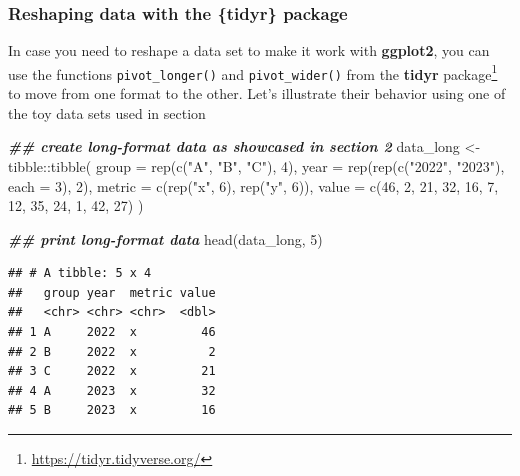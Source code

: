 \documentclass[
]{krantz}
\makeatletter
\newenvironment{Shaded}{\begin{snugshade}}{\end{snugshade}}
\newcommand{\AttributeTok}[1]{\textcolor[rgb]{0.61,0.61,0.61}{#1}}
\newcommand{\DecValTok}[1]{\textcolor[rgb]{0.06,0.06,0.06}{#1}}
\newcommand{\DocumentationTok}[1]{\textcolor[rgb]{0.37,0.37,0.37}{\textbf{\textit{#1}}}}
\newcommand{\FunctionTok}[1]{\textcolor[rgb]{0,0,0}{#1}}
\newcommand{\NormalTok}[1]{#1}
\newcommand{\OtherTok}[1]{\textcolor[rgb]{0.37,0.37,0.37}{#1}}
\newcommand{\SpecialCharTok}[1]{\textcolor[rgb]{0,0,0}{#1}}
\newcommand{\StringTok}[1]{\textcolor[rgb]{0.5,0.5,0.5}{#1}}
\renewcommand{\href}[2]{#2\footnote{\url{#1}}}
\newenvironment{kframe}{%
\medskip{}
\setlength{\fboxsep}{.8em}
 \def\at@end@of@kframe{}%
 \ifinner\ifhmode%
  \def\at@end@of@kframe{\end{minipage}}%
  \begin{minipage}{\columnwidth}%
 \fi\fi%
 \def\FrameCommand##1{\hskip\@totalleftmargin \hskip-\fboxsep
 \colorbox{shadecolor}{##1}\hskip-\fboxsep
     \hskip-\linewidth \hskip-\@totalleftmargin \hskip\columnwidth}%
 \MakeFramed {\advance\hsize-\width
   \@totalleftmargin\z@ \linewidth\hsize
   \@setminipage}}%
 {\par\unskip\endMakeFramed%
 \at@end@of@kframe}
\renewenvironment{Shaded}{\begin{kframe}}{\end{kframe}}
\makeatother
\begin{document}
\hypertarget{tidyr}{%
\subsubsection{Reshaping data with the \{tidyr\} package}\label{tidyr}}

In case you need to reshape a data set to make it work with \textbf{ggplot2}, you can use the functions \texttt{pivot\_longer()} and \texttt{pivot\_wider()} from the \href{https://tidyr.tidyverse.org/}{\textbf{tidyr} package} \citep{tidyr} to move from one format to the other. Let's illustrate their behavior using one of the toy data sets used in section

\begin{Shaded}
\begin{Highlighting}[]
\DocumentationTok{\#\# create long{-}format data as showcased in section 2}
\NormalTok{data\_long }\OtherTok{\textless{}{-}}\NormalTok{ tibble}\SpecialCharTok{::}\FunctionTok{tibble}\NormalTok{(}
  \AttributeTok{group =} \FunctionTok{rep}\NormalTok{(}\FunctionTok{c}\NormalTok{(}\StringTok{"A"}\NormalTok{, }\StringTok{"B"}\NormalTok{, }\StringTok{"C"}\NormalTok{), }\DecValTok{4}\NormalTok{),}
  \AttributeTok{year =} \FunctionTok{rep}\NormalTok{(}\FunctionTok{rep}\NormalTok{(}\FunctionTok{c}\NormalTok{(}\StringTok{"2022"}\NormalTok{, }\StringTok{"2023"}\NormalTok{), }\AttributeTok{each =} \DecValTok{3}\NormalTok{), }\DecValTok{2}\NormalTok{),}
  \AttributeTok{metric =} \FunctionTok{c}\NormalTok{(}\FunctionTok{rep}\NormalTok{(}\StringTok{"x"}\NormalTok{, }\DecValTok{6}\NormalTok{), }\FunctionTok{rep}\NormalTok{(}\StringTok{"y"}\NormalTok{, }\DecValTok{6}\NormalTok{)),}
  \AttributeTok{value =} \FunctionTok{c}\NormalTok{(}\DecValTok{46}\NormalTok{, }\DecValTok{2}\NormalTok{, }\DecValTok{21}\NormalTok{, }\DecValTok{32}\NormalTok{, }\DecValTok{16}\NormalTok{, }\DecValTok{7}\NormalTok{, }\DecValTok{12}\NormalTok{, }\DecValTok{35}\NormalTok{, }\DecValTok{24}\NormalTok{, }\DecValTok{1}\NormalTok{, }\DecValTok{42}\NormalTok{, }\DecValTok{27}\NormalTok{)}
\NormalTok{)}

\DocumentationTok{\#\# print long{-}format data}
\FunctionTok{head}\NormalTok{(data\_long, }\DecValTok{5}\NormalTok{)}
\end{Highlighting}
\end{Shaded}

\begin{verbatim}
## # A tibble: 5 x 4
##   group year  metric value
##   <chr> <chr> <chr>  <dbl>
## 1 A     2022  x         46
## 2 B     2022  x          2
## 3 C     2022  x         21
## 4 A     2023  x         32
## 5 B     2023  x         16
\end{verbatim}
\end{document}
